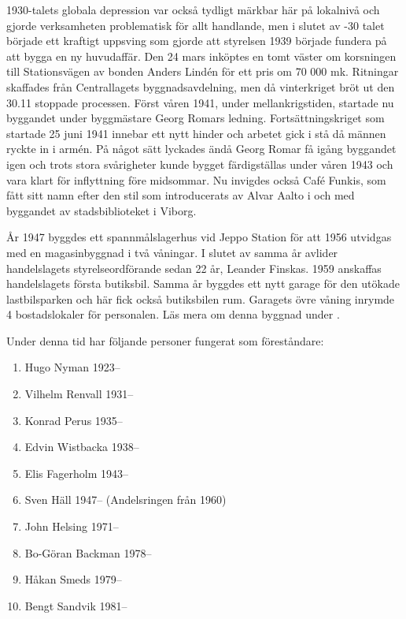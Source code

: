 1930-talets globala depression var också tydligt märkbar här på lokalnivå och gjorde verksamheten problematisk för allt handlande, men i slutet av -30 talet började ett kraftigt uppsving som gjorde att styrelsen 1939 började fundera på att bygga en ny huvudaffär. Den 24 mars inköptes en tomt väster om korsningen till Stationsvägen av bonden Anders Lindén för ett pris om 70 000 mk. Ritningar skaffades från Centrallagets byggnadsavdelning, men då vinterkriget bröt ut den 30.11 stoppade processen. Först våren 1941, under mellankrigstiden, startade nu byggandet under byggmästare Georg Romars ledning. Fortsättningskriget som startade 25 juni 1941 innebar ett nytt hinder och arbetet gick i stå då männen ryckte in i armén. På något sätt lyckades ändå Georg Romar få igång byggandet igen och trots stora svårigheter kunde bygget färdigställas under våren 1943 och vara klart för inflyttning före midsommar. Nu invigdes också Café Funkis, som fått sitt namn efter den stil som introducerats av Alvar Aalto i och med byggandet av stadsbiblioteket i Viborg.

År 1947 byggdes ett spannmålslagerhus vid Jeppo Station för att 1956 utvidgas med en magasinbyggnad i två våningar. I slutet av samma år avlider handelslagets styrelseordförande sedan 22 år, Leander Finskas. 1959 anskaffas handelslagets första butiksbil. Samma år byggdes ett nytt garage för den utökade lastbilsparken och här fick också butiksbilen rum. Garagets övre våning inrymde 4 bostadslokaler för personalen. Läs mera om denna byggnad under .

Under denna tid har följande personer fungerat som föreståndare:
\begin{enumerate}
  \item Hugo Nyman        1923--
  \item Vilhelm Renvall   1931--
  \item Konrad Perus      1935--
  \item Edvin Wistbacka   1938--
  \item Elis Fagerholm    1943--
  \item Sven Häll         1947-- (Andelsringen från 1960)
  \item John Helsing      1971--
  \item Bo-Göran Backman  1978--
  \item Håkan Smeds       1979--
  \item Bengt Sandvik     1981--
\end{enumerate}


